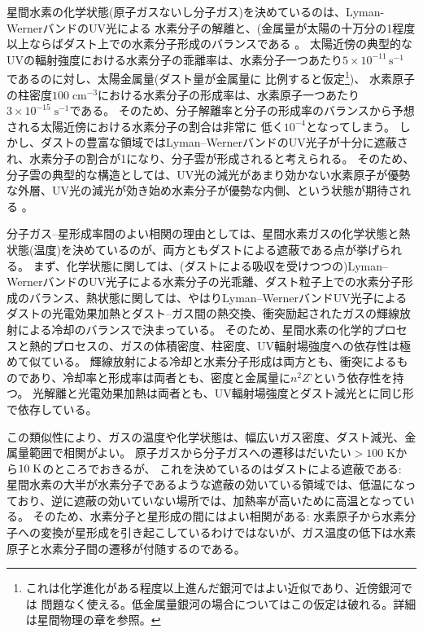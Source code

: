 星間水素の化学状態(原子ガスないし分子ガス)を決めているのは、Lyman-WernerバンドのUV光による
水素分子の解離と、(金属量が太陽の十万分の1程度以上ならばダスト上での水素分子形成のバランスである
\citep{omukai2010}。
太陽近傍の典型的なUVの輻射強度における水素分子の乖離率は、水素分子一つあたり$5\times 
10^{-11}\, \mbox{s}^{-1}$ \citep{1996ApJ...468..269D}であるのに対し、太陽金属量(ダスト量が金属量に
比例すると仮定\footnote{これは化学進化がある程度以上進んだ銀河ではよい近似であり、近傍銀河では
問題なく使える。低金属量銀河の場合についてはこの仮定は破れる。詳細は星間物理の章を参照。})、
水素原子の柱密度$100
\; \mbox{cm}^{-3}$における水素分子の形成率は、水素原子一つあたり$3 \times 10^{-15}\; \mbox{s}^{-1}$である。
そのため、分子解離率と分子の形成率のバランスから予想される太陽近傍における水素分子の割合は非常に
低く$10^{-4}$となってしまう。
しかし、ダストの豊富な領域ではLyman--WernerバンドのUV光子が十分に遮蔽され、水素分子の割合が1になり、分子雲が形成されると考えられる。
そのため、分子雲の典型的な構造としては、UV光の減光があまり効かない水素原子が優勢な外層、UV光の減光が効き始め水素分子が優勢な内側、という状態が期待される
\citep[e.g.,][]{van_dishoeck1986, sternberg1988, neufeld1996, liszt2002, glover2007, 2008ApJ...689..865K, 2009ApJ...697...55G, 2010ApJ...709..308M, mac_low2012}。

分子ガス--星形成率間のよい相関の理由としては、星間水素ガスの化学状態と熱状態(温度)を決めているのが、両方ともダストによる遮蔽である点が挙げられる。
まず、化学状態に関しては、(ダストによる吸収を受けつつの)Lyman--WernerバンドのUV光子による水素分子の光乖離、ダスト粒子上での水素分子形成のバランス、熱状態に関しては、やはりLyman--WernerバンドUV光子によるダストの光電効果加熱とダスト--ガス間の熱交換、衝突励起されたガスの輝線放射による冷却のバランスで決まっている。
そのため、星間水素の化学的プロセスと熱的プロセスの、ガスの体積密度、柱密度、UV輻射場強度への依存性は極めて似ている。
輝線放射による冷却と水素分子形成は両方とも、衝突によるものであり、冷却率と形成率は両者とも、密度と金属量に$n^2 Z’$という依存性を持つ。
光解離と光電効果加熱は両者とも、UV輻射場強度とダスト減光とに同じ形で依存している。

この類似性により、ガスの温度や化学状態は、幅広いガス密度、ダスト減光、金属量範囲で相関がよい。
原子ガスから分子ガスへの遷移はだいたい$>100\; \mbox{K}$から$\mbox 10\;  \mbox{K}$のところでおきるが、
これを決めているのはダストによる遮蔽である:
星間水素の大半が水素分子であるような遮蔽の効いている領域では、低温になっており、逆に遮蔽の効いていない場所では、加熱率が高いために高温となっている。
そのため、水素分子と星形成の間にはよい相関がある:
水素原子から水素分子への変換が星形成を引き起こしているわけではないが、ガス温度の低下は水素原子と水素分子間の遷移が付随するのである。

